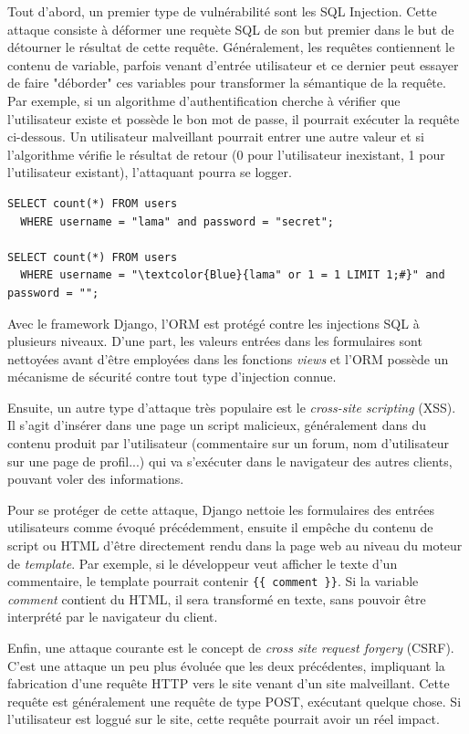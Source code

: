 \documentclass[a4paper,12pt]{article}
\begin{document}
Tout d'abord, un premier type de vulnérabilité sont les SQL Injection. Cette attaque
consiste à déformer une requète SQL  de son but premier dans le but de détourner
le résultat de cette requête. Généralement, les requêtes contiennent le contenu
de variable, parfois venant d'entrée utilisateur et ce dernier peut essayer
de faire "déborder" ces variables pour transformer la sémantique de la requête. Par
exemple, si un algorithme d'authentification cherche à vérifier que l'utilisateur existe
et possède le bon mot de passe, il pourrait exécuter la requête ci-dessous.
Un utilisateur malveillant pourrait entrer une autre valeur et si l'algorithme
vérifie le résultat de retour (0 pour l'utilisateur inexistant, 1 pour l'utilisateur
existant), l'attaquant pourra se logger.	

\begin{Verbatim}
SELECT count(*) FROM users
  WHERE username = "lama" and password = "secret";

SELECT count(*) FROM users
  WHERE username = "\textcolor{Blue}{lama" or 1 = 1 LIMIT 1;#}" and password = "";
\end{Verbatim}

Avec le framework Django, l'ORM est protégé contre les injections SQL à plusieurs
niveaux. D'une part, les valeurs entrées dans les formulaires sont nettoyées avant
d'être employées dans les fonctions \textit{views} et l'ORM possède un mécanisme
de sécurité contre tout type d'injection connue.

Ensuite, un autre type d'attaque très populaire est le \textit{cross-site scripting} (XSS).
Il s'agit d'insérer dans une page un script malicieux, généralement dans du contenu
produit par l'utilisateur (commentaire sur un forum, nom d'utilisateur sur une page de profil...)
qui va s'exécuter dans le navigateur des autres clients, pouvant voler des informations.

Pour se protéger de cette attaque, Django nettoie les formulaires des entrées utilisateurs
comme évoqué précédemment, ensuite il empêche du contenu de script ou HTML d'être directement
rendu dans la page web au niveau du moteur de \textit{template}. Par exemple,
si le développeur veut afficher le texte d'un commentaire, le template pourrait contenir
\texttt{\{\{ comment \}\}}. Si la variable \textit{comment} contient du HTML,
il sera transformé en texte, sans pouvoir être interprété par le navigateur du client.

Enfin, une attaque courante est le concept de \textit{cross site request forgery} (CSRF).
C'est une attaque un peu plus évoluée que les deux précédentes, impliquant la fabrication
d'une requête HTTP vers le site venant d'un site malveillant. Cette requête est généralement
une requête de type POST, exécutant quelque chose. Si l'utilisateur est loggué sur le site,
cette requête pourrait avoir un réel impact.
\end{document}
